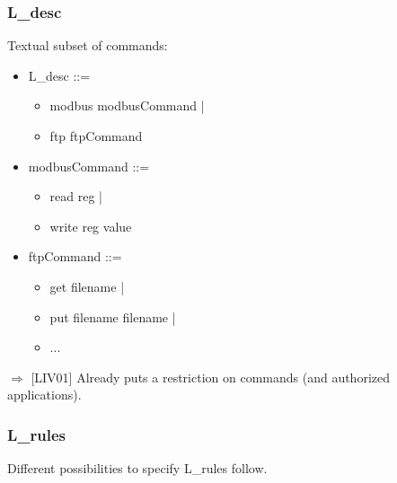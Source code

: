 \documentclass{beamer}
\begin{document}
\begin{frame}
    \frametitle{L\_desc}

    Textual subset of commands:
    \vfill
    \begin{itemize}
        \item[~] L\_desc ::=
        \begin{itemize}
            \item[~] modbus modbusCommand |
            \item[~] ftp ftpCommand
        \end{itemize}
        \item[~] modbusCommand ::= 
        \begin{itemize}
            \item[~] read reg |
            \item[~] write reg value
        \end{itemize}
        \item[~] ftpCommand ::=
        \begin{itemize}
            \item[~] get filename |
            \item[~] put filename filename |
            \item[~] ...
        \end{itemize}
    \end{itemize}
    \vfill
    $\Rightarrow$ [LIV01] Already puts a restriction on commands (and authorized applications).
\end{frame}

\begin{frame}
    \frametitle{L\_rules}

    Different possibilities to specify L\_rules follow.
\end{frame}
\end{document}
